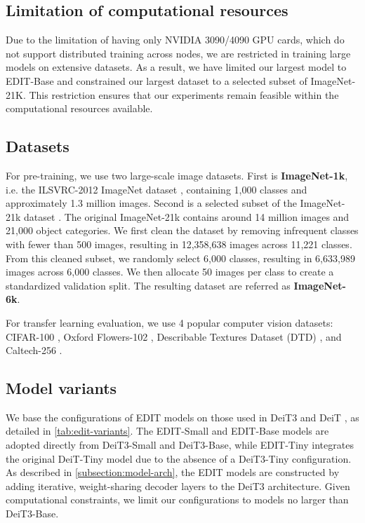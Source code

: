 \subsection{Limitation of computational resources}
Due to the limitation of having only NVIDIA 3090/4090 GPU cards, which do not support distributed training across nodes, we are restricted in training large models on extensive datasets. As a result, we have limited our largest model to EDIT-Base and constrained our largest dataset to a selected subset of ImageNet-21K. This restriction ensures that our experiments remain feasible within the computational resources available.

\subsection{Datasets} \label{subsec:datasets}
For pre-training, we use two large-scale image datasets.
First is \textbf{ImageNet-1k}, i.e. the ILSVRC-2012 ImageNet dataset \cite{deng2009imagenet}, containing 1,000 classes and approximately 1.3 million images.
Second is a selected subset of the ImageNet-21k dataset \cite{ridnik2021imagenetk,deng2009imagenet}.
The original ImageNet-21k contains around 14 million images and 21,000 object categories. We first clean the dataset by removing infrequent classes with fewer than 500 images, resulting in 12,358,638 images across 11,221 classes. From this cleaned subset, we randomly select 6,000 classes, resulting in 6,633,989 images across 6,000 classes. We then allocate 50 images per class to create a standardized validation split. The resulting dataset are referred as \textbf{ImageNet-6k}.

For transfer learning evaluation, we use 4 popular computer vision datasets: CIFAR-100 \cite{krizhevsky2009learning}, Oxford Flowers-102 \cite{Nilsback08}, Describable Textures Dataset (DTD) \cite{cimpoi14describing}, and Caltech-256 \cite{griffin_holub_perona_2022}.

\subsection{Model variants}
We base the configurations of EDIT models on those used in DeiT3 \cite{touvron2022deit} and DeiT \cite{touvron2021training}, as detailed in \cref{tab:edit-variants}. The EDIT-Small and EDIT-Base models are adopted directly from DeiT3-Small and DeiT3-Base, while EDIT-Tiny integrates the original DeiT-Tiny model due to the absence of a DeiT3-Tiny configuration.
As described in \cref{subsection:model-arch}, the EDIT models are constructed by adding iterative, weight-sharing decoder layers to the DeiT3 architecture. Given computational constraints, we limit our configurations to models no larger than DeiT3-Base.

